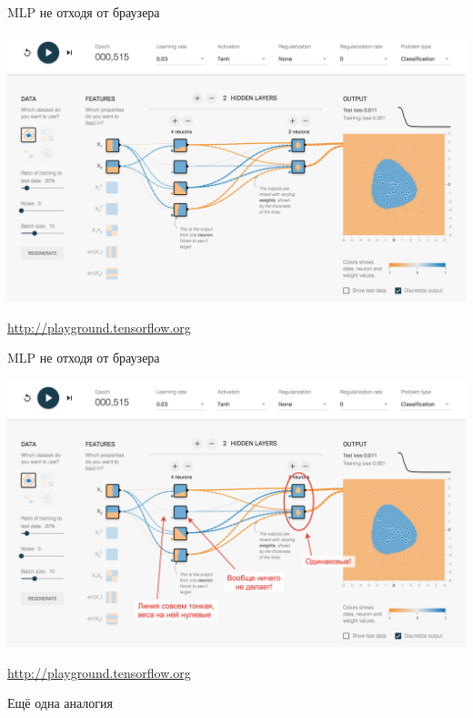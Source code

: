\documentclass[notes,12pt, aspectratio=169]{beamer}
\begin{document}
\begin{frame}{MLP не отходя от браузера}
\begin{center}
	\includegraphics[width=0.76\paperwidth]{tensorflow_demo.png}
\end{center}
\vfill %
\footnotesize
\color{blue} \url{http://playground.tensorflow.org}
\end{frame}


\begin{frame}{MLP не отходя от браузера}
\begin{center}
	\includegraphics[width=0.76\paperwidth]{tensorflow_demo2.png}
\end{center}
\vfill %
\footnotesize
\color{blue} \url{http://playground.tensorflow.org}
\end{frame}


\begin{frame}{Ещё одна аналогия}
\begin{center}
\end{center}
\end{frame}
\end{document}
